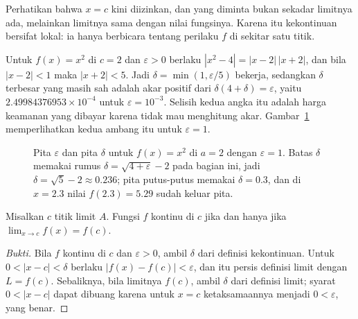 Perhatikan bahwa $x=c$ kini diizinkan, dan yang diminta bukan sekadar limitnya ada,
melainkan limitnya sama dengan nilai fungsinya. Karena itu kekontinuan bersifat
lokal: ia hanya berbicara tentang perilaku $f$ di sekitar satu titik.

Untuk $f(x)=x^{2}$ di $c=2$ dan $\varepsilon>0$ berlaku $|x^{2}-4|=|x-2|\,|x+2|$, dan
bila $|x-2|<1$ maka $|x+2|<5$. Jadi $\delta=\min(1,\varepsilon/5)$ bekerja, sedangkan
$\delta$ terbesar yang masih sah adalah akar positif dari $\delta(4+\delta)=\varepsilon$,
yaitu $2.49984376953\times10^{-4}$ untuk $\varepsilon=10^{-3}$. Selisih kedua angka itu
adalah harga keamanan yang dibayar karena tidak mau menghitung akar.
Gambar~\ref{fig:epsdelta} memperlihatkan kedua ambang itu untuk $\varepsilon=1$.

\begin{figure}[htbp]
\centering
{}
\caption{Pita $\varepsilon$ dan pita $\delta$ untuk $f(x)=x^{2}$ di $a=2$ dengan
$\varepsilon=1$. Batas $\delta$ memakai rumus $\delta=\sqrt{4+\varepsilon}-2$
pada bagian ini, jadi $\delta=\sqrt{5}-2\approx0.236$; pita putus-putus memakai
$\delta=0.3$, dan di $x=2.3$ nilai $f(2.3)=5.29$ sudah keluar pita.}
\label{fig:epsdelta}
\end{figure}

\begin{proposisi}
Misalkan $c$ titik limit $A$. Fungsi $f$ kontinu di $c$ jika dan hanya jika
$\lim_{x\to c}f(x)=f(c)$.
\end{proposisi}

\begin{proof}[Bukti]
Bila $f$ kontinu di $c$ dan $\varepsilon>0$, ambil $\delta$ dari definisi
kekontinuan. Untuk $0<|x-c|<\delta$ berlaku $|f(x)-f(c)|<\varepsilon$, dan itu persis
definisi limit dengan $L=f(c)$. Sebaliknya, bila limitnya $f(c)$, ambil $\delta$ dari
definisi limit; syarat $0<|x-c|$ dapat dibuang karena untuk $x=c$ ketaksamaannya
menjadi $0<\varepsilon$, yang benar.
\end{proof}

